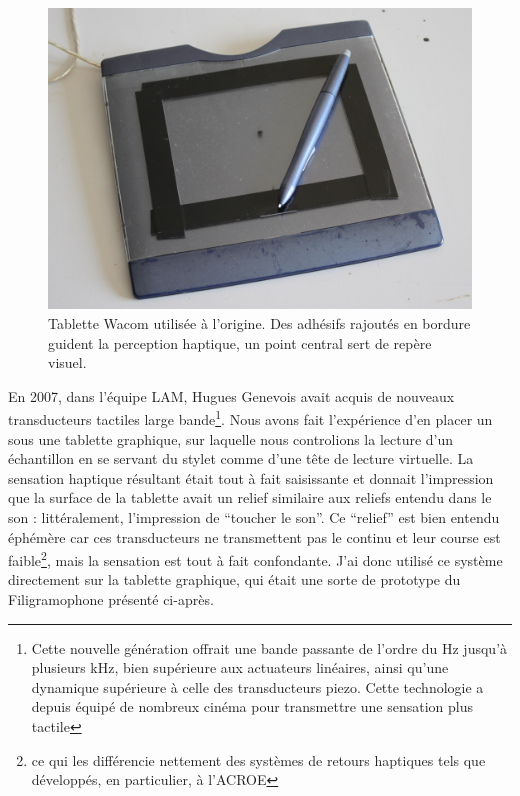 \begin{figure}[!htbp]
	\captionsetup{format=plain}%
	\includegraphics[width=\textwidth]{gfx/05_interfaces/wacom.jpg}
	\caption[Tablette wacom]{Tablette Wacom utilisée à l'origine. Des adhésifs rajoutés en bordure guident la perception haptique, un point central sert de repère visuel.}
	\label{fig:interface:wacom}
\end{figure}
\indent En 2007, dans l'équipe \gls{LAM}, Hugues Genevois avait acquis de nouveaux transducteurs tactiles large bande\footnote{Cette nouvelle génération offrait une bande passante de l'ordre du Hz jusqu'à plusieurs kHz, bien supérieure aux actuateurs linéaires, ainsi qu'une dynamique supérieure à celle des transducteurs piezo. Cette technologie a depuis équipé de nombreux cinéma pour transmettre une sensation plus tactile}. Nous avons fait l'expérience d'en placer un sous une tablette graphique, sur laquelle nous controlions la lecture d'un échantillon en se servant du stylet comme d'une tête de lecture virtuelle. La sensation haptique résultant était tout à fait saisissante et donnait l'impression que la surface de la tablette avait un relief similaire aux reliefs entendu dans le son : littéralement, l'impression de ``toucher le son''. Ce ``relief'' est bien entendu éphémère car ces transducteurs ne transmettent pas le continu et leur course est faible\footnote{ce qui les différencie nettement des systèmes de retours haptiques tels que développés, en particulier, à l'\gls{ACROE}}, mais la sensation est tout à fait confondante. J'ai donc utilisé ce système directement sur la tablette graphique, qui était une sorte de prototype du Filigramophone présenté ci-après.

